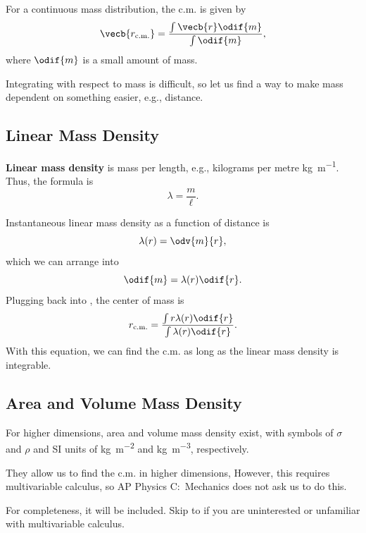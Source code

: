 For a continuous mass distribution, the c.m. is given by
\begin{equation} \label{eq:continuous-cm}
    \vecb{r_{\mathrm{c.m.}}} = \frac{\int \vecb{r} \odif{m}}{\int \odif{m}},
\end{equation}
where \(\odif{m}\) is a small amount of mass.

Integrating with respect to mass is difficult,
so let us find a way to make mass dependent on something easier,
e.g., distance.

\subsection{Linear Mass Density}

\textbf{Linear mass density} is mass per length,
e.g., kilograms per metre \unit{\kilogram \per \metre}.
Thus, the formula is
\begin{equation}
    \lambda = \frac{m}{\ell}.
\end{equation}

Instantaneous linear mass density as a function of distance is
\begin{equation}
    \lambda(r) = \odv{m}{r},
\end{equation}
which we can arrange into
\begin{equation}
    \odif{m} = \lambda(r) \odif{r}.
\end{equation}
Plugging back into , the center of mass is
\begin{equation}
    r_{\mathrm{c.m.}} =
    \frac{\int r \lambda(r) \odif{r}}{\int\lambda(r) \odif{r}}.
\end{equation}
With this equation,
we can find the c.m. as long as the linear mass density is integrable.

\subsection{Area and Volume Mass Density}

For higher dimensions, area and volume mass density exist,
with symbols of \(\sigma\) and \(\rho\)
and SI units of \unit{\kilogram \per \metre\squared}
and \unit{\kilogram \per \metre\cubed}, respectively.

They allow us to find the c.m. in higher dimensions,
However, this requires multivariable calculus,
so AP Physics C:~Mechanics does not ask us to do this.

For completeness, it will be included.
Skip to  if you are uninterested
or unfamiliar with multivariable calculus.

